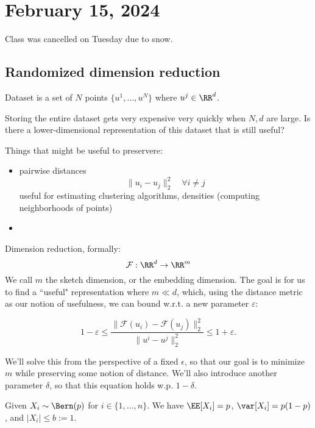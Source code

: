 \section{February 15, 2024}

Class was cancelled on Tuesday due to snow. 

\subsection{Randomized dimension reduction}

\begin{example}
\exlabel

Dataset is a set of $N$ points $\{u^1, \hdots, u^N\}$ where $u^j\in \RR^{d}$. 
\end{example}

Storing the entire dataset gets very expensive very quickly when $N,d$ are large. Is there a lower-dimensional representation of this dataset that is still useful? 

Things that might be useful to preservere: 
\begin{itemize}
	\item pairwise distances 
		\[\lVert u_i - u_j\rVert_2^2\quad \forall i\neq j\] 
		useful for estimating clustering algorithms, densities (computing neighborhoods of points)
	\item  
\end{itemize}

Dimension reduction, formally: 
\[\mathcal{F} : \RR^d\rightarrow \RR^m\] 
We call $m$ the \ac{sketch dimension}, or the \ac{embedding dimension}. The goal is for us to find a ``useful" representation where $m \ll d$, which, using the distance metric as our notion of usefulness, we can bound w.r.t. a new parameter $\varepsilon$:  

\[1 - \varepsilon \leq \frac{\lVert \mathcal{F}(u_i) - \mathcal{F}(u_j)\rVert_2^2}{\lVert u^i - u^j\rVert_2^2} \leq 1 + \varepsilon.\]

We'll solve this from the perspective of a fixed $\epsilon$, so that our goal is to minimize $m$ while preserving some notion of distance. We'll also introduce another parameter $\delta$, so that this equation holds w.p. $1-\delta$.

\begin{example}

Given $X_i\sim \Bern(p)$ for $i\in \{1,\hdots,n\}$. We have $\EE[X_i]=p$, $\var[X_i]=p(1-p)$, and $\vert X_i\vert\leq b:=1$. 
\end{example}

